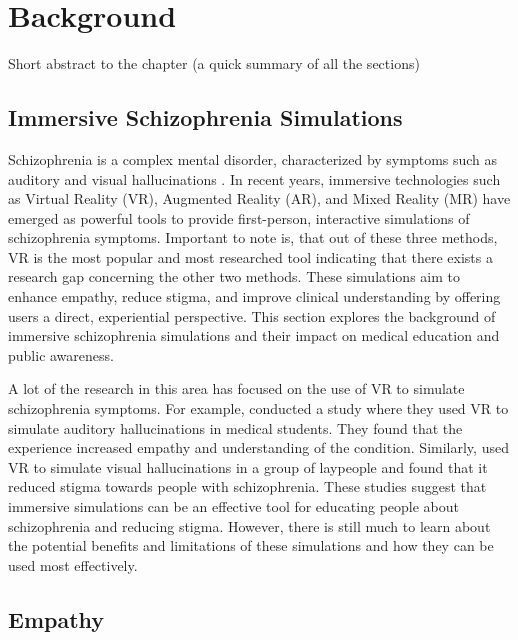 \chapter{Background}
\label{ch:background}

Short abstract to the chapter (a quick summary of all the sections)

\section{Immersive Schizophrenia Simulations}
Schizophrenia is a complex mental disorder, characterized by symptoms such as auditory and visual hallucinations \cite{Silverstein2021}. In recent years, immersive technologies such as Virtual Reality (VR), Augmented Reality (AR), and Mixed Reality (MR) have emerged as powerful tools to provide first-person, interactive simulations of schizophrenia symptoms. Important to note is, that out of these three methods, VR is the most popular and most researched tool \cite{Kuhail2022} indicating that there exists a research gap concerning the other two methods. These simulations aim to enhance empathy, reduce stigma, and improve clinical understanding by offering users a direct, experiential perspective. This section explores the background of immersive schizophrenia simulations and their impact on medical education and public awareness.


A lot of the research in this area has focused on the use of VR to simulate schizophrenia symptoms. For example, \cite{Kuhail2022} conducted a study where they used VR to simulate auditory hallucinations in medical students. They found that the experience increased empathy and understanding of the condition. Similarly, \cite{Silverstein2021} used VR to simulate visual hallucinations in a group of laypeople and found that it reduced stigma towards people with schizophrenia. These studies suggest that immersive simulations can be an effective tool for educating people about schizophrenia and reducing stigma. However, there is still much to learn about the potential benefits and limitations of these simulations and how they can be used most effectively.

\section{Empathy}



